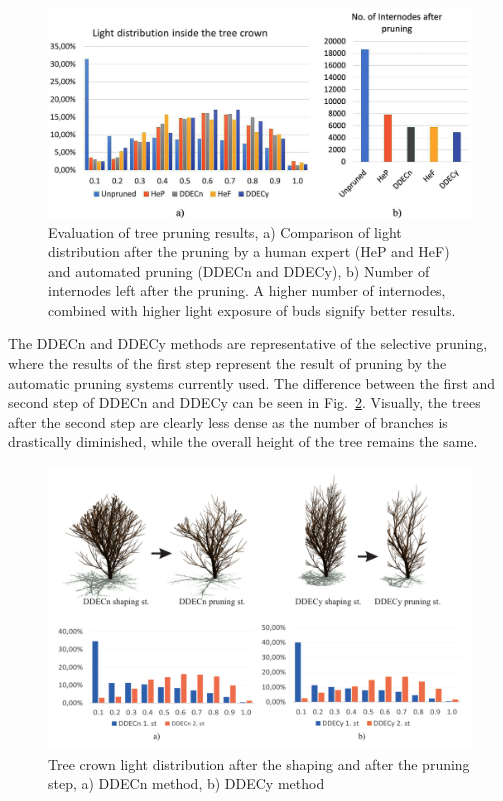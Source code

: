 \begin{figure}[hbt]
    \centering
    \includegraphics[width=\linewidth]{figs/image5.jpeg}
    \caption{Evaluation of tree pruning results, a) Comparison of
light distribution after the pruning by a human expert (HeP and HeF) and
automated pruning (DDECn and DDECy), b) Number of internodes left after
the pruning. A higher number of internodes, combined with higher light
exposure of buds signify better results.}
\label{fig:my_figure5}
\end{figure}

The DDECn and DDECy methods are representative of the selective pruning, where the
results of the first step represent the result of pruning by the
automatic pruning systems currently used. The difference between the
first and second step of DDECn and DDECy can be seen in Fig.~\ref{fig:my_figure6}. Visually, the trees after the second step are clearly less dense as the number of branches is drastically diminished,
while the overall height of the tree remains the same.

\begin{figure}[hbt]
    \centering
    \includegraphics[width=\linewidth]{figs/Fig7.pdf}
    \caption{Tree crown light distribution after the shaping and
after the pruning step, a) DDECn method, b) DDECy method}
    \label{fig:my_figure6}
\end{figure}


